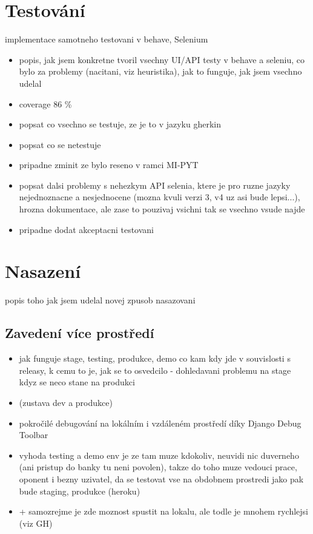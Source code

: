 \chapter{Testování}
implementace samotneho testovani v behave, Selenium
\begin{itemize}
\item popis, jak jsem konkretne tvoril vsechny UI/API testy v behave a seleniu, co bylo za problemy (nacitani, viz heuristika), jak to funguje, jak jsem vsechno udelal
\item coverage 86 \%
\item popsat co vsechno se testuje, ze je to v jazyku gherkin
\item popsat co se netestuje
\item pripadne zminit ze bylo reseno v ramci MI-PYT
\item popsat dalsi problemy s nehezkym API selenia, ktere je pro ruzne jazyky nejednoznacne a nesjednocene (mozna kvuli verzi 3, v4 uz asi bude lepsi...), hrozna dokumentace, ale zase to pouzivaj vsichni tak se vsechno vsude najde
\item pripadne dodat akceptacni testovani
\end{itemize}


\chapter{Nasazení}
popis toho jak jsem udelal novej zpusob nasazovani

\section{Zavedení více prostředí}
\begin{itemize}
\item jak funguje stage, testing, produkce, demo co kam kdy jde v souvislosti s releasy, k cemu to je, jak se to osvedcilo - dohledavani problemu na stage kdyz se neco stane na produkci
\item (zustava dev a produkce)
\item pokročilé debugování na lokálním i vzdáleném prostředí díky Django Debug Toolbar 
\item vyhoda testing a demo env je ze tam muze kdokoliv, neuvidi nic duverneho (ani pristup do banky tu neni povolen), takze do toho muze vedouci prace, oponent i bezny uzivatel, da se testovat vse na obdobnem prostredi jako pak bude staging, produkce (heroku)
\item + samozrejme je zde moznost spustit na lokalu, ale todle je mnohem rychlejsi (viz GH)
\end{itemize}

